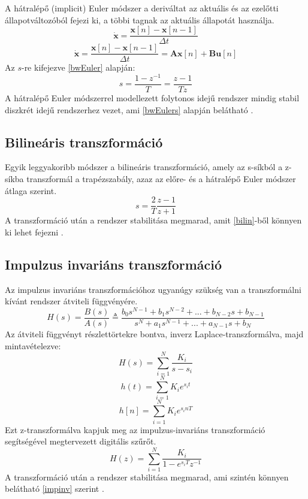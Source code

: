 A hátralépő (implicit) Euler módszer a deriváltat az aktuális és az ezelőtti állapotváltozóból fejezi ki, a többi tagnak
az aktuális állapotát használja.
\begin{equation}
    \mathbf{\dot{x}}=\frac{\mathbf{x}[n]-\mathbf{x}[n-1]}{\Delta{}t}
\label{bwEuler}
\end{equation}
\begin{equation}
    \mathbf{\dot{x}}=\frac{\mathbf{x}[n]-\mathbf{x}[n-1]}{\Delta{}t}=\mathbf{A}\mathbf{x}[n]+\mathbf{Bu}[n]
\end{equation}
Az $s$-re kifejezve \ref{bwEuler} alapján:
\begin{equation}
    s=\frac{1-z^{-1}}{T}=\frac{z-1}{Tz}
\label{bwEulers}
\end{equation}
A hátralépő Euler módszerrel modellezett folytonos idejű rendszer mindig stabil diszkrét idejű rendszerhez vezet, 
ami \ref{bwEulers} alapján belátható \cite{transformations}.  

\subsection{Bilineáris transzformáció}

Egyik leggyakoribb módszer a bilineáris transzformáció, amely az s-síkból a z-síkba transzformál a trapézszabály, azaz 
az előre- és a hátralépő Euler módszer átlaga szerint.
\begin{equation}
    s=\frac{2}{T}\frac{z-1}{z+1}
    \label{bilin}
\end{equation}
A transzformáció után a rendszer stabilitása megmarad, amit \ref{bilin}-ből könnyen ki lehet fejezni \cite{transformations}.

\subsection{Impulzus invariáns transzformáció}

Az impulzus invariáns transzformációhoz ugyanúgy szükség van a transzformálni kívánt rendszer átviteli függvényére.
\begin{equation}
    H(s)=\frac{B(s)}{A(s)}\triangleq\frac{b_0s^{N-1}+b_1s^{N-2}+...+b_{N-2}s+b_{N-1}}{s^N+a_1s^{N-1}+...+a_{N-1}s+b_{N}}
\end{equation}
Az átviteli függvényt részlettörtekre bontva, inverz Laplace-transzformálva, majd mintavételezve:
\begin{equation}
    H(s)=\sum_{i=1}^{N}\frac{K_i}{s-s_i}
\end{equation}
\begin{equation}
    h(t)=\sum_{i=1}^{N}K_ie^{s_it}
\end{equation}
\begin{equation}
    h[n]=\sum_{i=1}^{N}K_ie^{s_inT}
\end{equation}
Ezt z-transzformálva kapjuk meg az impulzus-invariáns transzformáció segítségével megtervezett digitális 
szűrőt.
\begin{equation}
    H(z)=\sum_{i=1}^{N}\frac{K_i}{1-e^{s_iT}z^{-1}}
    \label{impinv}
\end{equation}
A transzformáció után a rendszer stabilitása megmarad, ami szintén könnyen belátható \ref{impinv} szerint \cite{transformations}.

